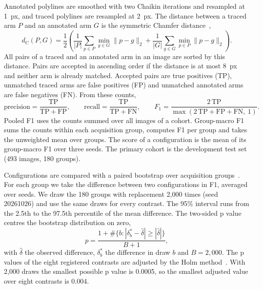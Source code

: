 Annotated polylines are smoothed with two Chaikin iterations and resampled at 1~px, and traced polylines are resampled at 2~px.
The distance between a traced arm $P$ and an annotated arm $G$ is the symmetric Chamfer distance~\cite{barrow1977parametric,fan2017point},
\begin{equation}
d_{\mathrm{C}}(P,G) = \frac{1}{2}\left(
  \frac{1}{|P|}\sum_{p\in P}\min_{g\in G}\lVert p-g\rVert_2
  +
  \frac{1}{|G|}\sum_{g\in G}\min_{p\in P}\lVert p-g\rVert_2 \right).
\label{eq:s1chamfer}
\end{equation}
All pairs of a traced and an annotated arm in an image are sorted by this distance.
Pairs are accepted in ascending order if the distance is at most 8~px and neither arm is already matched.
Accepted pairs are true positives (TP), unmatched traced arms are false positives (FP) and unmatched annotated arms are false negatives (FN).
From these counts,
\begin{equation}
\mathrm{precision} = \frac{\mathrm{TP}}{\mathrm{TP}+\mathrm{FP}}, \qquad
\mathrm{recall} = \frac{\mathrm{TP}}{\mathrm{TP}+\mathrm{FN}}, \qquad
F_1 = \frac{2\,\mathrm{TP}}{\max\left(2\,\mathrm{TP}+\mathrm{FP}+\mathrm{FN},\ 1\right)} .
\label{eq:s1f1}
\end{equation}
Pooled F1 uses the counts summed over all images of a cohort.
Group-macro F1 sums the counts within each acquisition group, computes F1 per group and takes the unweighted mean over groups.
The score of a configuration is the mean of its group-macro F1 over three seeds.
The primary cohort is the development test set (493 images, 180 groups).

Configurations are compared with a paired bootstrap over acquisition groups~\cite{efron1979bootstrap,field2007bootstrapping}.
For each group we take the difference between two configurations in F1, averaged over seeds.
We draw the 180 groups with replacement 2,000 times (seed 20261026) and use the same draws for every contrast.
The 95\% interval runs from the 2.5th to the 97.5th percentile of the mean difference.
The two-sided p value centres the bootstrap distribution on zero,
\begin{equation}
p = \frac{1 + \#\{b : |\delta^{*}_b - \hat\delta| \geq |\hat\delta|\}}{B+1},
\label{eq:s1pvalue}
\end{equation}
with $\hat\delta$ the observed difference, $\delta^{*}_b$ the difference in draw $b$ and $B = 2{,}000$.
The p values of the eight registered contrasts are adjusted by the Holm method~\cite{holm1979simple}.
With 2,000 draws the smallest possible p value is 0.0005, so the smallest adjusted value over eight contrasts is 0.004.

